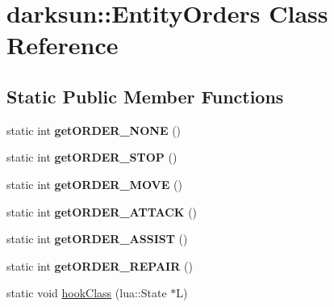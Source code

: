 \hypertarget{classdarksun_1_1_entity_orders}{}\section{darksun\+::Entity\+Orders Class Reference}
\label{classdarksun_1_1_entity_orders}
\subsection*{Static Public Member Functions}
\begin{DoxyCompactItemize}
\item 
\mbox{\label{classdarksun_1_1_entity_orders_a70d2bba5b68663d165e1bb17b7b322be}} 
static int {\bfseries get\+O\+R\+D\+E\+R\+\_\+\+N\+O\+NE} ()
\item 
\mbox{\label{classdarksun_1_1_entity_orders_aba69a4dbad55a095856d6cc0505d77b9}} 
static int {\bfseries get\+O\+R\+D\+E\+R\+\_\+\+S\+T\+OP} ()
\item 
\mbox{\label{classdarksun_1_1_entity_orders_afe3d3de2b643e485306dcb6143beaec0}} 
static int {\bfseries get\+O\+R\+D\+E\+R\+\_\+\+M\+O\+VE} ()
\item 
\mbox{\label{classdarksun_1_1_entity_orders_a362f1d0f2108e8ee468b82893e5b3319}} 
static int {\bfseries get\+O\+R\+D\+E\+R\+\_\+\+A\+T\+T\+A\+CK} ()
\item 
\mbox{\label{classdarksun_1_1_entity_orders_ab36f28ef08d87db91115060310b1ac72}} 
static int {\bfseries get\+O\+R\+D\+E\+R\+\_\+\+A\+S\+S\+I\+ST} ()
\item 
\mbox{\label{classdarksun_1_1_entity_orders_a72e67827f4554ff3b294e182baa955f2}} 
static int {\bfseries get\+O\+R\+D\+E\+R\+\_\+\+R\+E\+P\+A\+IR} ()
\item 
static void \mbox{\hyperlink{classdarksun_1_1_entity_orders_aa7f4168fd2376ad3e4250215019e0407}{hook\+Class}} (lua\+::\+State $\ast$L)
\end{DoxyCompactItemize}
